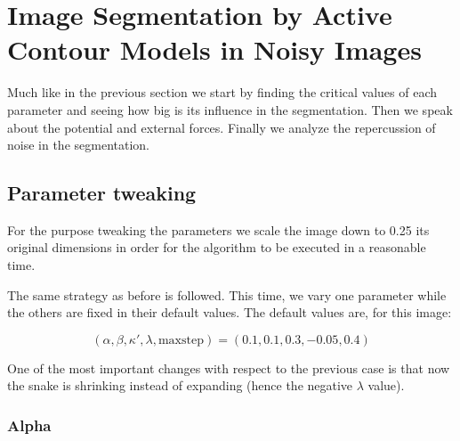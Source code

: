 \section{Image Segmentation by Active Contour Models in Noisy Images}

Much like in the previous section we start by finding the critical values
of each parameter and seeing how big is its influence in the segmentation.
Then we speak about the potential and external forces. Finally we analyze the
repercussion of noise in the segmentation.

\subsection{Parameter tweaking}

For the purpose tweaking the parameters we scale the image down to 0.25 its original
dimensions in order for the algorithm to be executed in a reasonable time.

The same strategy as before is followed. This time, we vary one parameter while the
others are fixed in their default values. The default values are, for this image:

\[ (\alpha , \beta , \kappa' , \lambda , \mathrm{maxstep} ) = (0.1, 0.1, 0.3, -0.05, 0.4) \]

One of the most important changes with respect to the previous case is that now the snake is
shrinking instead of expanding (hence the negative $ \lambda $ value).

\subsubsection{Alpha}

